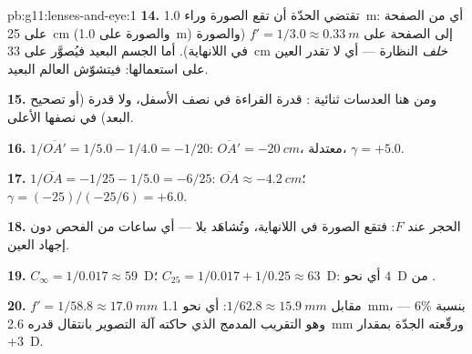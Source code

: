 \begin{solution}{pb:g11:lenses-and-eye:1}
\textbf{14.} تقتضي الحدّة أن تقع الصورة وراء \qty{1.0}{m}: أي من الصفحة
على \qty{25}{cm} (والصورة على \qty{1.0}{m}) إلى الصفحة على
$f' = 1/3.0 \approx \qty{0.33}{m}$ (والصورة في اللانهاية). أما الجسم البعيد
فيُصوَّر على \qty{33}{cm} \emph{خلف} النظارة --- أي 
لا تقدر العين على استعمالها: فيتشوّش العالم البعيد.

\textbf{15.} ومن هنا العدسات ثنائية : قدرة القراءة في نصف
 الأسفل، ولا قدرة (أو تصحيح البعد) في نصفها الأعلى.

\textbf{16.} $1/\overline{OA'} = 1/5.0 - 1/4.0 = -1/20$:
$\overline{OA'} = \qty{-20}{cm}$،  معتدلة، $\gamma = +5.0$.

\textbf{17.} $1/\overline{OA} = -1/25 - 1/5.0 = -6/25$:
$\overline{OA} \approx \qty{-4.2}{cm}$؛ $\gamma = (-25)/(-25/6) = +6.0$.

\textbf{18.} الحجر عند $F$: فتقع الصورة في اللانهاية، وتُشاهَد بلا
 --- أي ساعات من الفحص دون إجهاد العين.

\textbf{19.} $C_\infty = 1/0.017 \approx 59$~D؛
$C_{25} = 1/0.017 + 1/0.25 \approx 63$~D: أي نحو $4$~D من
.

\textbf{20.} $f' = 1/58.8 \approx \qty{17.0}{mm}$ مقابل
$1/62.8 \approx \qty{15.9}{mm}$: أي نحو \qty{1.1}{mm}، بنسبة $6\%$ ---
وهو التقريب المدمج الذي حاكته آلة التصوير بانتقال قدره \qty{2.6}{mm}
ورقّعته الجدّة بمقدار $+3$~D.
\end{solution}
